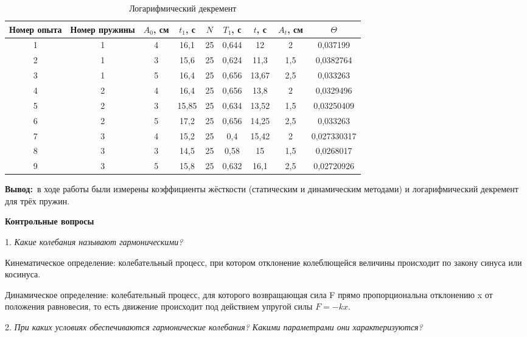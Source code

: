 \documentclass[12pt, letterpaper]{article}
\begin{document}
\begin{table}[h]
\caption{\label{tab:bolts} Логарифмический декремент}
\begin{center}
 \begin{tabular}{|c|c|c|c|c|c|c|c|c|} 
 \hline
Номер опыта & Номер пружины & \(A_0\), см & \(t_1\), с & \(N\) & \(T_1\), с & \(t\), с & \(A_t\), см & \(\Theta\) \\ [0.5ex] 
 \hline
 1 & 1 & 4 & 16,1 & 25 & 0,644 & 12 & 2 & 0,037199 \\ 
 \hline
 2 & 1 & 3 & 15,6 & 25 & 0,624 & 11,3 & 1,5 & 0,0382764 \\
 \hline
 3 & 1 & 5 & 16,4 & 25 & 0,656 & 13,67 & 2,5 & 0,033263 \\
 \hline
 4 & 2 & 4 & 16,4 & 25 & 0,656 & 13,8 & 2 & 0,0329496 \\
 \hline
 5 & 2 & 3 & 15,85 & 25 & 0,634 & 13,52 & 1,5 & 0,03250409 \\ 
  \hline
 6 & 2 & 5 & 17,2 & 25 & 0,656 & 14,25 & 2,5 & 0,033263 \\
 \hline
 7 & 3 & 4 & 15,2 & 25 & 0,4 & 15,42 & 2 & 0,027330317 \\
 \hline
 8 & 3 & 3 & 14,5 & 25 & 0,58 & 15 & 1,5 & 0,0268017 \\
  \hline
 9 & 3 & 5 & 15,8 & 25 & 0,632 & 16,1 & 2,5 & 0,02720926 \\
 \hline
\end{tabular}
\end{center}
\end{table}

\textbf{Вывод:}\ в ходе работы были измерены коэффициенты жёсткости (статическим и динамическим методами) и логарифмический декремент для трёх пружин.

\begin{center}
\Large{\textbf{\newline Контрольные вопросы}}\
\end{center}

1. \textit{Какие колебания называют гармоническими?}

Кинематическое определение: колебательный процесс, при котором отклонение колеблющейся величины происходит по закону синуса или косинуса.

Динамическое определение: колебательный процесс, для которого возвращающая сила F прямо пропорциональна отклонению x от положения равновесия, то есть движение происходит под действием упругой силы \(F=-kx\).\newline

2. \textit{При каких условиях обеспечиваются гармонические колебания? Какими параметрами они характеризуются?}
\end{document}
